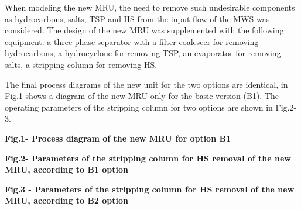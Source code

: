 
When modeling the new MRU, the need to remove such undesirable
components as hydrocarbons, salts, TSP and HS from the
input flow of the MWS was considered. The design of the new MRU was
supplemented with the following equipment: a three-phase separator with
a filter-coalescer for removing hydrocarbons, a hydrocyclone for
removing TSP, an evaporator for removing salts, a stripping column for
removing HS.

The final process diagrams of the new unit for the two options are
identical, in Fig.1 shows a diagram of the new MRU only for the basic
version (B1). The operating parameters of the stripping column for two
options are shown in Fig.2-3.


{\bfseries Fig.1- Process diagram of the new MRU for option B1}


{\bfseries Fig.2- Parameters of the stripping column for
HS removal of the new MRU, according to B1 option}


{\bfseries Fig.3 - Parameters of the stripping column for
HS removal of the new MRU, according to B2 option}

